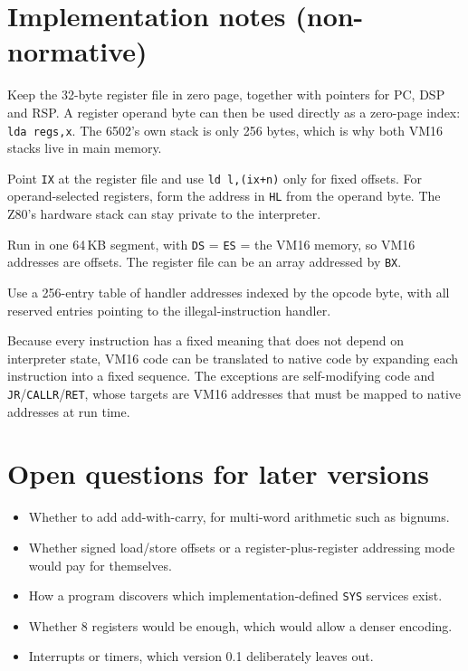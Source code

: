 \documentclass[11pt,a4paper]{article}
\newcommand{\vm}{VM16}
\newcommand{\op}[1]{\texttt{#1}}
\begin{document}
\section{Implementation notes (non-normative)}\label{app:notes}

\begin{description}[style=nextline, leftmargin=1.2em, itemsep=2pt]
\item[6502] Keep the 32-byte register file in zero page, together with
  pointers for PC, DSP and RSP. A register operand byte can then be used
  directly as a zero-page index: \texttt{lda regs,x}. The 6502's own stack
  is only 256 bytes, which is why both \vm{} stacks live in main memory.
\item[Z80] Point \texttt{IX} at the register file and use
  \texttt{ld l,(ix+n)} only for fixed offsets. For operand-selected registers,
  form the address in \texttt{HL} from the operand byte. The Z80's hardware
  stack can stay private to the interpreter.
\item[8086] Run in one 64\,KB segment, with \texttt{DS} = \texttt{ES} =
  the \vm{} memory, so \vm{} addresses are offsets. The register file can
  be an array addressed by \texttt{BX}.
\item[Dispatch] Use a 256-entry table of handler addresses indexed by the
  opcode byte, with all reserved entries pointing to the illegal-instruction
  handler.
\item[Translation] Because every instruction has a fixed meaning that does not
  depend on interpreter state, \vm{} code can be translated to native code by
  expanding each instruction into a fixed sequence. The exceptions are
  self-modifying code and \op{JR}/\op{CALLR}/\op{RET}, whose targets are
  \vm{} addresses that must be mapped to native addresses at run time.
\end{description}

\section{Open questions for later versions}

\begin{itemize}[nosep]
\item Whether to add add-with-carry, for multi-word arithmetic such as
  bignums.
\item Whether signed load/store offsets or a register-plus-register
  addressing mode would pay for themselves.
\item How a program discovers which implementation-defined \op{SYS}
  services exist.
\item Whether 8 registers would be enough, which would allow a denser
  encoding.
\item Interrupts or timers, which version 0.1 deliberately leaves out.
\end{itemize}
\end{document}
